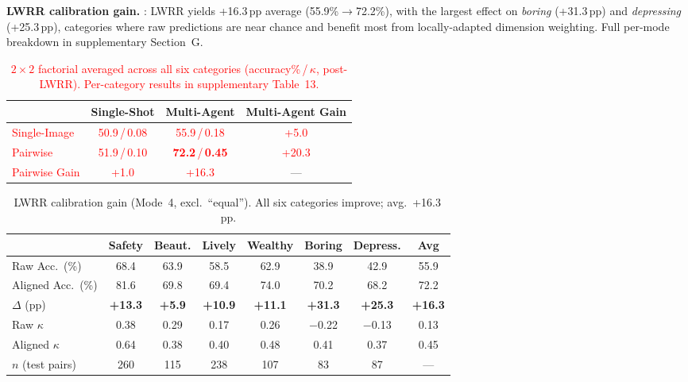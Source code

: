 \documentclass[runningheads]{llncs}
\begin{document}
\noindent\textbf{LWRR calibration gain.}
: LWRR yields +16.3\,pp average (55.9\%$\to$72.2\%), with the largest effect on \emph{boring} (+31.3\,pp) and \emph{depressing} (+25.3\,pp), categories where raw predictions are near chance and benefit most from locally-adapted dimension weighting.
Full per-mode breakdown in supplementary Section~G.
\begingroup\setlength{\intextsep}{4mm}%
\begin{table}[H]
\centering
\caption{\textcolor{red}{$2{\times}2$ factorial averaged across all six categories (accuracy\%\,/\,$\kappa$, post-LWRR). Per-category results in supplementary Table~13.}}
\label{tab:factorial}
\small
\begin{tabular}{l|cc|c}
\toprule
 & Single-Shot & Multi-Agent & Multi-Agent Gain \\
\midrule
\textcolor{red}{Single-Image} & \textcolor{red}{50.9\,/\,0.08} & \textcolor{red}{55.9\,/\,0.18} & \textcolor{red}{+5.0} \\
\textcolor{red}{Pairwise}     & \textcolor{red}{51.9\,/\,0.10} & \textcolor{red}{\textbf{72.2}\,/\,\textbf{0.45}} & \textcolor{red}{+20.3} \\
\midrule
\textcolor{red}{Pairwise Gain} & \textcolor{red}{+1.0} & \textcolor{red}{+16.3} & --- \\
\bottomrule
\end{tabular}
\end{table}\endgroup
\begingroup\setlength{\intextsep}{4mm}%
\begin{table}[H]
\centering
\caption{LWRR calibration gain (Mode~4, excl.\ ``equal''). All six categories improve; avg.\ +16.3\,pp.}
\label{tab:vrm_gain_main}
\small
\begin{tabular}{lcccccc|c}
\toprule
 & Safety & Beaut. & Lively & Wealthy & Boring & Depress. & Avg \\
\midrule
Raw Acc.\ (\%)     & 68.4 & 63.9 & 58.5 & 62.9 & 38.9 & 42.9 & 55.9 \\
Aligned Acc.\ (\%) & 81.6 & 69.8 & 69.4 & 74.0 & 70.2 & 68.2 & 72.2 \\
$\Delta$ (pp)      & \textbf{+13.3} & \textbf{+5.9} & \textbf{+10.9} & \textbf{+11.1} & \textbf{+31.3} & \textbf{+25.3} & \textbf{+16.3} \\
\midrule
Raw $\kappa$       & 0.38 & 0.29 & 0.17 & 0.26 & $-$0.22 & $-$0.13 & 0.13 \\
Aligned $\kappa$   & 0.64 & 0.38 & 0.40 & 0.48 & 0.41 & 0.37 & 0.45 \\
\midrule
$n$ (test pairs)   & 260 & 115 & 238 & 107 & 83 & 87 & --- \\
\bottomrule
\end{tabular}
\end{table}\endgroup
\end{document}

